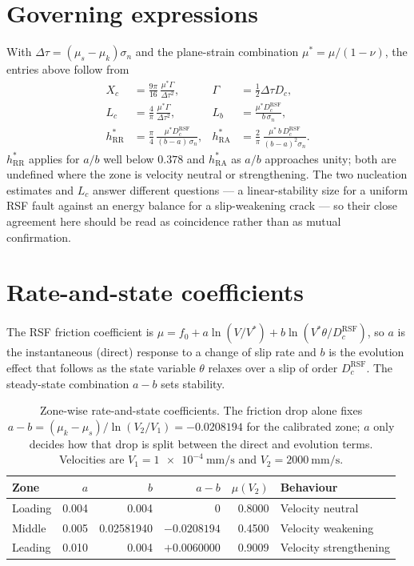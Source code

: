 \documentclass[11pt]{article}
\begin{document}
\newpage
\section*{Governing expressions}

With $\Delta\tau = (\mu_s - \mu_k)\sigma_n$ and the plane-strain combination
$\mu^{*} = \mu/(1-\nu)$, the entries above follow from
%
\begin{align}
  X_c &= \frac{9\pi}{16}\,\frac{\mu^{*}\Gamma}{\Delta\tau^{2}},
  &
  \Gamma &= \tfrac{1}{2}\Delta\tau D_c,
  \\
  L_c &= \frac{4}{\pi}\,\frac{\mu^{*}\Gamma}{\Delta\tau^{2}},
  &
  L_b &= \frac{\mu^{*} D_c^{\mathrm{RSF}}}{b\,\sigma_n},
  \\
  h^{*}_{\mathrm{RR}} &=
    \frac{\pi}{4}\,\frac{\mu^{*} D_c^{\mathrm{RSF}}}{(b-a)\,\sigma_n},
  &
  h^{*}_{\mathrm{RA}} &=
    \frac{2}{\pi}\,\frac{\mu^{*}\, b\, D_c^{\mathrm{RSF}}}{(b-a)^{2}\sigma_n}.
\end{align}
%
$h^{*}_{\mathrm{RR}}$ applies for $a/b$ well below $0.378$ and
$h^{*}_{\mathrm{RA}}$ as $a/b$ approaches unity; both are undefined where the
zone is velocity neutral or strengthening. The two nucleation estimates and
$L_c$ answer different questions --- a linear-stability size for a uniform RSF
fault against an energy balance for a slip-weakening crack --- so their close
agreement here should be read as coincidence rather than as mutual
confirmation.

\section*{Rate-and-state coefficients}

The RSF friction coefficient is
$\mu = f_0 + a\ln(V/V^{*}) + b\ln(V^{*}\theta/D_c^{\mathrm{RSF}})$, so $a$ is
the instantaneous (direct) response to a change of slip rate and $b$ is the
evolution effect that follows as the state variable $\theta$ relaxes over a
slip of order $D_c^{\mathrm{RSF}}$. The steady-state combination $a-b$ sets
stability.

\begin{table}[htbp]
  \centering
  \footnotesize
  \caption{Zone-wise rate-and-state coefficients. The friction drop alone fixes
  $a-b = (\mu_k-\mu_s)/\ln(V_2/V_1) = -0.0208194$ for the calibrated zone; $a$
  only decides how that drop is split between the direct and evolution terms.
  Velocities are $V_1 = \SI{1e-4}{\milli\meter\per\second}$ and
  $V_2 = \SI{2000}{\milli\meter\per\second}$.}
  \label{tab:rsf-zones}
  \begin{tabular}{@{}l r r r r l@{}}
    \toprule
    Zone & $a$ & $b$ & $a-b$ & $\mu(V_2)$ & Behaviour \\
    \midrule
    Loading & 0.004 & 0.004        & $0$          & 0.8000 & Velocity neutral \\
    Middle  & 0.005 & 0.02581940   & $-0.0208194$ & 0.4500 & Velocity weakening \\
    Leading & 0.010 & 0.004        & $+0.0060000$ & 0.9009 & Velocity strengthening \\
    \bottomrule
  \end{tabular}
\end{table}
\end{document}
